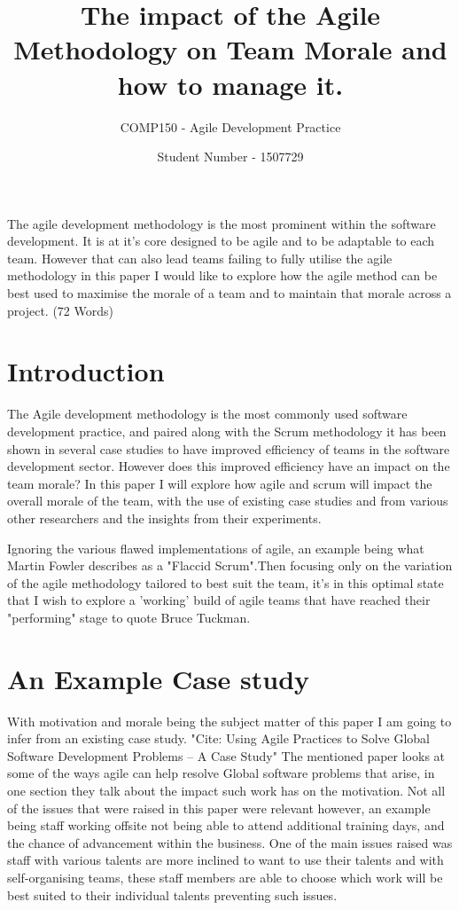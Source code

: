 \documentclass{scrartcl}
\title{The impact of the Agile Methodology on Team Morale and how to manage it.}
\subtitle{COMP150 - Agile Development Practice}
\author{Student Number - 1507729}
\begin{document}
\maketitle

\abstract The agile development methodology is the most prominent within the software development. It is at it's core designed to be agile and to be adaptable to each team. However that can also lead teams failing to fully utilise the agile methodology  in this paper I would like to explore how the agile method can be best used to maximise the morale of a team and to maintain that morale across a project. (72 Words)

\section{Introduction}

The Agile development methodology \cite{Agile} is the most commonly used software development practice, and paired along with the Scrum methodology it has been shown in several case studies to have improved efficiency of teams in the software development sector. However does this improved efficiency have an impact on the team morale? In this paper I will explore how agile and scrum will impact the overall morale of the team, with the use of existing case studies and from various other researchers and the insights from their experiments. 

Ignoring the various flawed implementations of agile, an example being what Martin Fowler describes as a "Flaccid Scrum".Then focusing only on the variation of the agile methodology tailored to best suit the team, it's in this optimal state that I wish to explore a 'working' build of agile teams that have reached their "performing" stage to quote Bruce Tuckman. 

\section{An Example Case study}

With motivation and morale being the subject matter of this paper I am going to infer from an existing case study. "Cite: Using Agile Practices to Solve Global Software Development Problems -- A Case Study" The mentioned paper looks at some of the ways agile can help resolve Global software problems that arise, in one section they talk about the impact such work has on the motivation. Not all of the issues that were raised in this paper were relevant however, an example being staff working offsite not being able to attend additional training days, and the chance of advancement within the business. One of the main issues raised was staff with various talents are more inclined to want to use their talents and with self-organising teams, these staff members are able to choose which work will be best suited to their individual talents preventing such issues.
\end{document}
